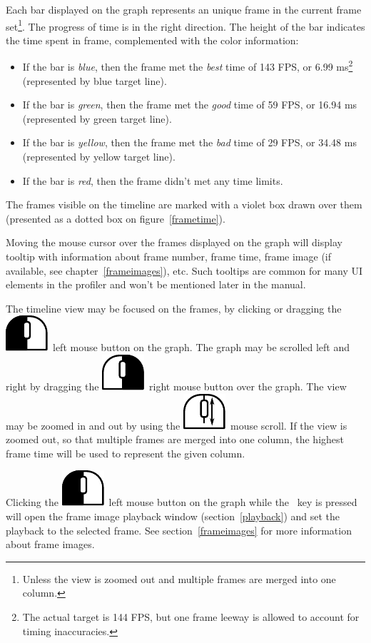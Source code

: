 \documentclass[hidelinks,titlepage,a4paper]{article}
\newcommand{\LMB}{\includegraphics[height=.8\baselineskip]{icons/lmb}}
\newcommand{\RMB}{\includegraphics[height=.8\baselineskip]{icons/rmb}}
\newcommand{\Scroll}{\includegraphics[height=.8\baselineskip]{icons/scroll}}
\begin{document}
Each bar displayed on the graph represents an unique frame in the current frame set\footnote{Unless the view is zoomed out and multiple frames are merged into one column.}. The progress of time is in the right direction. The height of the bar indicates the time spent in frame, complemented with the color information:

\begin{itemize}
\item If the bar is \emph{blue}, then the frame met the \emph{best} time of 143 FPS, or 6.99 \si{\milli\second}\footnote{The actual target is 144 FPS, but one frame leeway is allowed to account for timing inaccuracies.} (represented by blue target line).
\item If the bar is \emph{green}, then the frame met the \emph{good} time of 59 FPS, or 16.94 \si{\milli\second} (represented by green target line).
\item If the bar is \emph{yellow}, then the frame met the \emph{bad} time of 29 FPS, or 34.48 \si{\milli\second} (represented by yellow target line).
\item If the bar is \emph{red}, then the frame didn't met any time limits.
\end{itemize}

The frames visible on the timeline are marked with a violet box drawn over them (presented as a dotted box on figure~\ref{frametime}).

Moving the \faMousePointer{} mouse cursor over the frames displayed on the graph will display tooltip with information about frame number, frame time, frame image (if available, see chapter~\ref{frameimages}), etc. Such tooltips are common for many UI elements in the profiler and won't be mentioned later in the manual.

The timeline view may be focused on the frames, by clicking or dragging the \LMB{}~left mouse button on the graph. The graph may be scrolled left and right by dragging the \RMB{}~right mouse button over the graph. The view may be zoomed in and out by using the \Scroll{}~mouse scroll. If the view is zoomed out, so that multiple frames are merged into one column, the highest frame time will be used to represent the given column.

Clicking the \LMB{}~left mouse button on the graph while the \keys{\ctrl}~key is pressed will open the frame image playback window (section~\ref{playback}) and set the playback to the selected frame. See section~\ref{frameimages} for more information about frame images.
\end{document}
